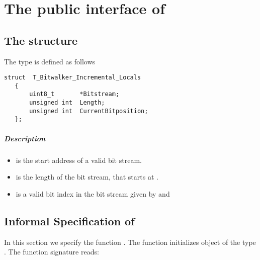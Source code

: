 

\chapter{The public interface of \bitwalker}

\section{The structure \bitwalkertype}


The type \bitwalkertype is defined as follows\\[1em]

\begin{lstlisting}[style=acsl-block]
   struct  T_Bitwalker_Incremental_Locals
   {
       uint8_t       *Bitstream;
       unsigned int  Length;
       unsigned int  CurrentBitposition;
   };
\end{lstlisting}


\paragraph{Description}

\begin{itemize}

   \item {} is  the start address of a valid bit stream.
   \item {} is the length of the bit stream, that starts at .
   \item {} is a valid bit index in
              the bit stream given by  and 

\end{itemize}


\clearpage

\section{Informal Specification of }

In this section we specify the function \init.
 The function  initializes object of the type \bitwalkertype.
The function signature reads:\\[1em]


